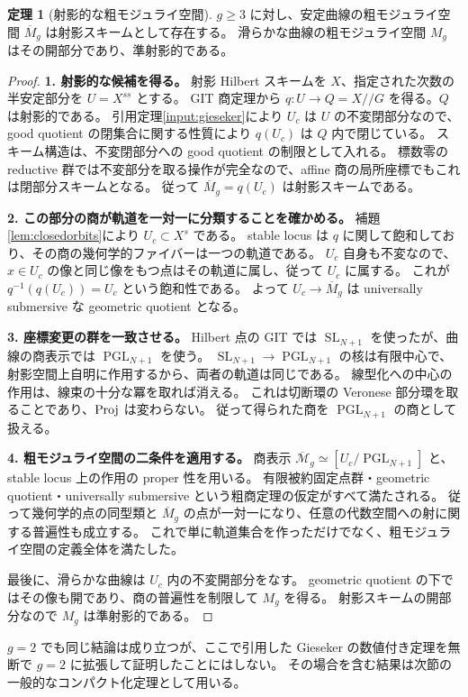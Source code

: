 \documentclass[dvipdfmx,a4paper,11pt]{article}
\theoremstyle{definition}
\newtheorem{thm}{定理}[section]
\DeclareMathOperator{\SL}{SL}\DeclareMathOperator{\PGL}{PGL}\DeclareMathOperator{\PSL}{PSL}
\newcommand{\cM}{\overline{\mathcal M}}
\begin{document}
\begin{thm}[射影的な粗モジュライ空間]\label{thm:projectivecoarse}
$g\ge3$ に対し、安定曲線の粗モジュライ空間 $\overline M_g$ は射影スキームとして存在する。
滑らかな曲線の粗モジュライ空間 $M_g$ はその開部分であり、準射影的である。
\end{thm}
\begin{proof}
\textbf{1. 射影的な候補を得る。}
射影 Hilbert スキームを $X$、指定された次数の半安定部分を $U=X^{ss}$ とする。
GIT 商定理から $q:U\to Q=X/\!/G$ を得る。$Q$ は射影的である。
引用定理\ref{input:gieseker}により $U_c$ は $U$ の不変閉部分なので、good quotient の閉集合に関する性質により $q(U_c)$ は $Q$ 内で閉じている。
スキーム構造は、不変閉部分への good quotient の制限として入れる。
標数零の reductive 群では不変部分を取る操作が完全なので、affine 商の局所座標でもこれは閉部分スキームとなる。
従って $\overline M_g=q(U_c)$ は射影スキームである。

\textbf{2. この部分の商が軌道を一対一に分類することを確かめる。}
補題\ref{lem:closedorbits}により $U_c\subset X^s$ である。
stable locus は $q$ に関して飽和しており、その商の幾何学的ファイバーは一つの軌道である。
$U_c$ 自身も不変なので、$x\in U_c$ の像と同じ像をもつ点はその軌道に属し、従って $U_c$ に属する。
これが $q^{-1}(q(U_c))=U_c$ という飽和性である。
よって $U_c\to\overline M_g$ は universally submersive な geometric quotient となる。

\textbf{3. 座標変更の群を一致させる。}
Hilbert 点の GIT では $\SL_{N+1}$ を使ったが、曲線の商表示では $\PGL_{N+1}$ を使う。
$\SL_{N+1}\to\PGL_{N+1}$ の核は有限中心で、射影空間上自明に作用するから、両者の軌道は同じである。
線型化への中心の作用は、線束の十分な冪を取れば消える。
これは切断環の Veronese 部分環を取ることであり、$\operatorname{Proj}$ は変わらない。
従って得られた商を $\PGL_{N+1}$ の商として扱える。

\textbf{4. 粗モジュライ空間の二条件を適用する。}
商表示 $\cM_g\simeq[U_c/\PGL_{N+1}]$ と、stable locus 上の作用の proper 性を用いる。
有限被約固定点群・geometric quotient・universally submersive という粗商定理の仮定がすべて満たされる。
従って幾何学的点の同型類と $\overline M_g$ の点が一対一になり、任意の代数空間への射に関する普遍性も成立する。
これで単に軌道集合を作っただけでなく、粗モジュライ空間の定義全体を満たした。

最後に、滑らかな曲線は $U_c$ 内の不変開部分をなす。
geometric quotient の下ではその像も開であり、商の普遍性を制限して $M_g$ を得る。
射影スキームの開部分なので $M_g$ は準射影的である。
\end{proof}
$g=2$ でも同じ結論は成り立つが、ここで引用した Gieseker の数値付き定理を無断で $g=2$ に拡張して証明したことにはしない。
その場合を含む結果は次節の一般的なコンパクト化定理として用いる。
\end{document}
